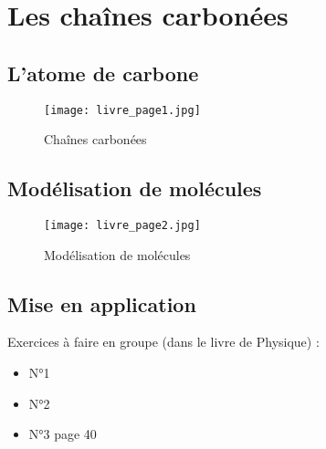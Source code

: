 \documentclass{article}
\begin{document}
\section{Les chaînes carbonées}

\subsection{L'atome de carbone}

\begin{figure}[H]
  \centering
  \texttt{[image: livre\_page1.jpg]}
  \caption{\label{} Chaînes carbonées}
\end{figure}

\subsection{Modélisation de molécules}

\begin{figure}[H]
  \centering
  \texttt{[image: livre\_page2.jpg]}
  \caption{\label{} Modélisation de molécules}
\end{figure}

\subsection{Mise en application}

\begin{tcolorbox}[colback=blue!10!white, colframe=blue!75!black, title=Application : Structure électronique]
  Exercices à faire en groupe (dans le livre de Physique) : 
  \begin{itemize}[noitemsep]
    \item N°1
    \item N°2
    \item N°3 page 40
  \end{itemize}
\end{tcolorbox}

\vspace{1em}
\end{document}
